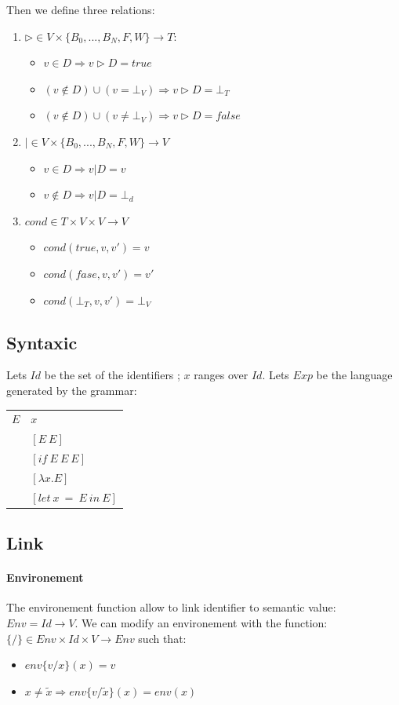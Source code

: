 \documentclass[a4paper]{report}
\begin{document}
Then we define three relations:
\begin{enumerate}
\item $\rhd \in V \times \{B_0, ..., B_N, F, W\} \to T$:
	\begin{itemize}
	\item $v \in D \Rightarrow v \rhd D = true$
	\item $(v \notin D) \cup (v = \bot_V) \Rightarrow v \rhd D = \bot_T$
	\item $(v \notin D) \cup (v \neq \bot_V) \Rightarrow v \rhd D = false$
	\end{itemize}
\item $| \in V \times \{B_0, ..., B_N, F, W\} \to V$
	\begin{itemize}
	\item $v \in D \Rightarrow v | D = v$
	\item $v \notin D \Rightarrow v | D = \bot_d$
	\end{itemize}
\item $cond \in T \times V \times V \to V$
	\begin{itemize}
	\item $cond(true,v,v') = v$
	\item $cond(fase,v,v') = v'$
	\item $cond(\bot_T,v,v') = \bot_V$
	\end{itemize}
\end{enumerate}

\subsection{Syntaxic}

Lets $Id$ be the set of the identifiers ; $x$ ranges over $Id$. Lets $Exp$ be the language generated by the grammar:

\begin{tabular}{|r|l|}
\hline
$E$ & $x$\\
& $[E\ E]$\\
& $[if\ E\ E\ E]$\\
& $[\lambda x.E]$\\
& $[let\ x\ =\ E\ in\ E]$\\
\hline
\end{tabular}

\subsection{Link}

\paragraph{Environement} The environement function allow to link identifier to semantic value: $Env = Id \to V$. We can modify an environement with the function: $\{/\} \in Env \times Id \times V \to Env$ such that:
\begin{itemize}
\item $env\{v/x\}(x)=v$
\item $x \neq\tilde x \Rightarrow env\{v/\tilde x\}(x) = env(x)$
\end{itemize}
\end{document}
